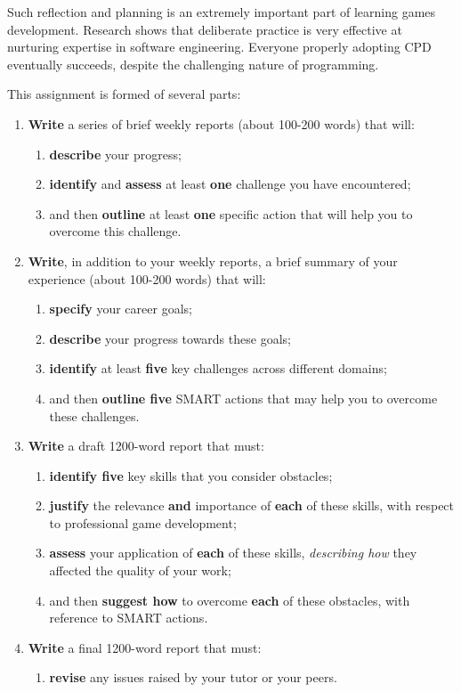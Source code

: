 \documentclass{../../fal_assignment}
\begin{document}
Such reflection and planning is an extremely important part of learning games development. Research shows that deliberate practice is very effective at nurturing expertise in software engineering. Everyone properly adopting CPD eventually succeeds, despite the challenging nature of programming.

This assignment is formed of several parts:

\begin{enumerate}[label=(\Alph*)]
    \item \textbf{Write} a series of brief weekly reports (about 100-200 words) that will:
    	\begin{enumerate}[label=\roman*.]
    		\item \textbf{describe} your progress;
    		\item \textbf{identify} and \textbf{assess} at least \textbf{one} challenge you have encountered;
    		\item and then \textbf{outline} at least \textbf{one} specific action that will help you to overcome this challenge.
	\end{enumerate}
	    \item \textbf{Write}, in addition to your weekly reports, a brief summary of your experience (about 100-200 words) that will:
    	\begin{enumerate}[label=\roman*.]
    		\item \textbf{specify} your career goals;
    		\item \textbf{describe} your progress towards these goals;
    		\item \textbf{identify} at least \textbf{five} key challenges across different domains;
    		\item and then \textbf{outline five} SMART actions that may help you to overcome these challenges.
	\end{enumerate}
    \item \textbf{Write} a draft 1200-word report that must:
    	\begin{enumerate}[label=\roman*.]
    		\item \textbf{identify five} key skills that you consider obstacles;
    		\item \textbf{justify} the relevance \textbf{and} importance of \textbf{each} of these skills, with respect to professional game development;
    		\item \textbf{assess} your application of \textbf{each} of these skills, \textit{describing how} they affected the quality of your work;
    		\item and then \textbf{suggest how} to overcome \textbf{each} of these obstacles, with reference to SMART actions.
	\end{enumerate}
    \item \textbf{Write} a final 1200-word report that must:
    	\begin{enumerate}[label=\roman*.]
    		\item \textbf{revise} any issues raised by your tutor or your peers.
	\end{enumerate}
\end{enumerate}
\end{document}
